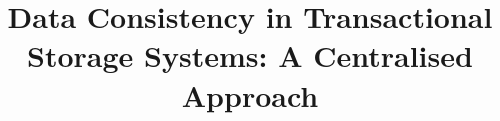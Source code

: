 \documentclass[runningheads,anonymous]{llncs}
\title{%
Data Consistency in Transactional Storage Systems: 
A Centralised Approach%
}
\author{}
\institute{}
\newcommand{\RootPath}{.}
\begin{document}
\maketitle

\begin{abstract}

\end{abstract}






%






\newpage
\onecolumn
\appendix

%
%







%
\end{document}
